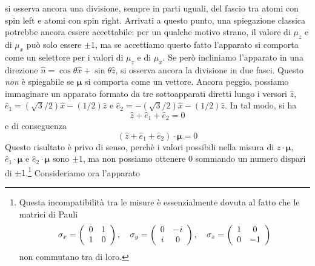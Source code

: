 \documentclass[a4paper, 11pt]{article}
\begin{document}
	\noindent si osserva ancora una divisione, sempre in parti uguali, del fascio tra atomi con spin left e atomi con spin right. Arrivati a questo punto, una spiegazione classica potrebbe ancora essere accettabile: per un qualche motivo strano, il valore di $\mu_z$ e di $\mu_x$ può solo essere $\pm1$, ma se accettiamo questo fatto l'apparato si comporta come un selettore per i valori di $\mu_z$ e di $\mu_x$. Se però incliniamo l'apparato in una direzione $\hat{n}=\cos\theta\hat{x}+\sin\theta\hat{z}$, si osserva ancora la divisione in due fasci. Questo \textit{non} è spiegabile se $\bm\mu$ si comporta come un vettore. Ancora peggio, possiamo immaginare un apparato formato da tre sottoapparati diretti lungo i versori $\hat{z}$, $\hat{e}_1=(\sqrt{3}/2)\hat{x}-(1/2)\hat{z}$ e $\hat{e}_2=-(\sqrt{3}/2)\hat{x}-(1/2)\hat{z}$. In tal modo, si ha
	\[\hat{z}+\hat{e}_1+\hat{e}_2=0\]
	e di conseguenza
	\[(\hat{z}+\hat{e}_1+\hat{e}_2)\cdot\bm\mu=0\]
	Questo risultato è privo di senso, perchè i valori possibili nella misura di $\hat{z}\cdot\bm\mu$, $\hat{e}_1\cdot\bm\mu$ e $\hat{e}_2\cdot\bm\mu$ sono $\pm1$, ma non possiamo ottenere 0 sommando un numero dispari di $\pm1$.\footnote{Questa incompatibilità tra le misure è essenzialmente dovuta al fatto che le matrici di Pauli
		\[
		\sigma_x=\left(\begin{array}{c c}
		0&1\\1&0
		\end{array}\right),\,\,\,\,\,\,\sigma_y=\left(\begin{array}{c c}
		0&-i\\i&0
		\end{array}\right),\,\,\,\,\,\,\sigma_z=\left(\begin{array}{c c}
		1&0\\0&-1
		\end{array}\right)
		\] non commutano tra di loro.} Consideriamo ora l'apparato\begin{figure}[h!]
		\centering
	\end{figure}
\end{document}
